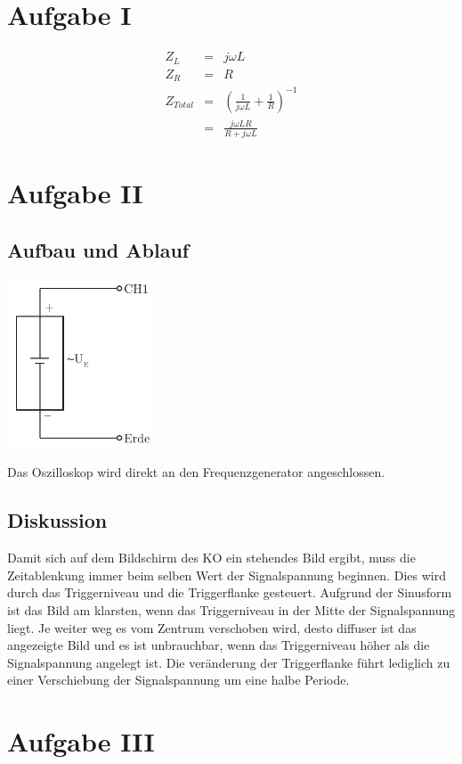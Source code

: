 \documentclass[12pt,a4paper]{article}
\begin{document}
\section*{Aufgabe I}
\begin{eqnarray*}
Z_L & = & j \omega L \\
Z_R & = & R \\
Z_{Total} & = & \left( \frac{1}{j \omega L} + \frac{1}{R} \right) ^{-1} \\
& = & \frac{j \omega L R}{R + j \omega L}
\end{eqnarray*}


\section*{Aufgabe II}
\subsection*{Aufbau und Ablauf}
\includegraphics[height=5cm]{illustration2.pdf}

Das Oszilloskop wird direkt an den Frequenzgenerator angeschlossen.

\subsection*{Diskussion}
Damit sich auf dem Bildschirm des KO ein stehendes Bild ergibt, muss die Zeitablenkung immer beim selben Wert der Signalspannung beginnen. Dies wird durch das Triggerniveau und die Triggerflanke gesteuert.
Aufgrund der Sinusform ist das Bild am klarsten, wenn das Triggerniveau in der Mitte der Signalspannung liegt. Je weiter weg es vom Zentrum verschoben wird, desto diffuser ist das angezeigte Bild und es ist unbrauchbar, wenn das Triggerniveau h\"oher als die Signalspannung angelegt ist.
Die ver\"anderung der Triggerflanke f\"uhrt lediglich zu einer Verschiebung der Signalspannung um eine halbe Periode.


\section*{Aufgabe III}
\end{document}
